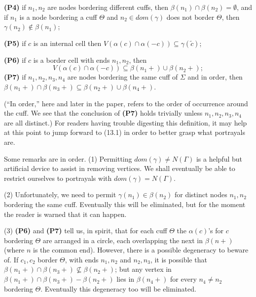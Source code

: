 \textbf{(P4)} if $n_1, n_2$ are nodes bordering different cuffs, then $\beta(n_1) \cap \beta(n_2) = \emptyset$, and if $n_1$ is a node bordering a cuff $\Theta$ and $n_2 \in dom(\gamma)$ does not border $\Theta$, then $\gamma(n_2) \notin \beta(n_1)$;

\textbf{(P5)} if $c$ is an internal cell then $V(\alpha(c) \cap \alpha(-c)) \subseteq \gamma(\tilde{c})$;

\textbf{(P6)} if $c$ is a border cell with ends $n_1, n_2$, then
\begin{equation*}
V(\alpha(c) \cap \alpha(-c)) \subseteq \beta(n_1 +) \cup \beta(n_2 +);
\end{equation*}
\textbf{(P7)} if $n_1, n_2, n_3, n_4$ are nodes bordering the same cuff of $\Sigma$ and in order, then $\beta(n_1 +) \cap \beta(n_3 +) \subseteq \beta(n_2 +) \cup \beta(n_4 +)$.

(``In order,'' here and later in the paper, refers to the order of occurrence around the cuff. We see that the conclusion of \textbf{(P7)} holds trivially unless $n_1, n_2, n_3, n_4$ are all distinct.) For readers having trouble digesting this definition, it may help at this point to jump forward to (13.1) in order to better grasp what portrayals are.

Some remarks are in order. (1) Permitting $dom(\gamma) \ne N(\Gamma)$ is a helpful but artificial device to assist in removing vertices. We shall eventually be able to restrict ourselves to portrayals with $dom(\gamma) = N(\Gamma)$.

\hspace*{12pt}(2) Unfortunately, we need to permit $\gamma(n_1) \in \beta(n_2)$ for distinct nodes $n_1, n_2$ bordering the same cuff. Eventually this will be eliminated, but for the moment the reader is warned that it can happen.

\hspace*{12pt}(3) \textbf{(P6)} and \textbf{(P7)} tell us, in spirit, that for each cuff $\Theta$ the $\alpha(c)$'s for $c$ bordering $\Theta$ are arranged in a circle, each overlapping the next in $\beta(n +)$ (where $n$ is the common end). However, there is a possible degeneracy to beware of. If $c_1, c_2$ border $\Theta$, with ends $n_1, n_2$ and $n_2, n_3$, it is possible that $\beta(n_1 +) \cap \beta(n_3 +) \not\subseteq \beta(n_2 +)$; but any vertex in $\beta(n_1 +) \cap \beta(n_3 +) - \beta(n_2 +)$ lies in $\beta(n_4 +)$ for every $n_4 \ne n_2$ bordering $\Theta$. Eventually this degeneracy too will be eliminated.

